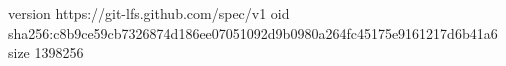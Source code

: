version https://git-lfs.github.com/spec/v1
oid sha256:c8b9ce59cb7326874d186ee07051092d9b0980a264fc45175e9161217d6b41a6
size 1398256
